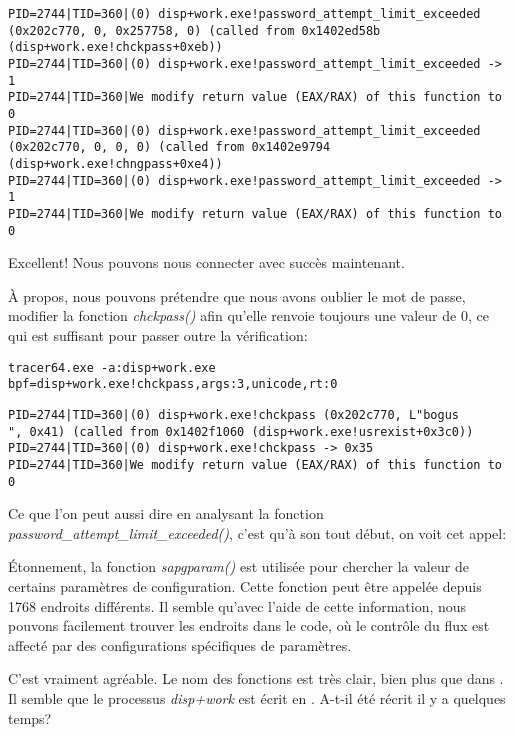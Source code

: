 \begin{lstlisting}
PID=2744|TID=360|(0) disp+work.exe!password_attempt_limit_exceeded (0x202c770, 0, 0x257758, 0) (called from 0x1402ed58b (disp+work.exe!chckpass+0xeb))
PID=2744|TID=360|(0) disp+work.exe!password_attempt_limit_exceeded -> 1
PID=2744|TID=360|We modify return value (EAX/RAX) of this function to 0
PID=2744|TID=360|(0) disp+work.exe!password_attempt_limit_exceeded (0x202c770, 0, 0, 0) (called from 0x1402e9794 (disp+work.exe!chngpass+0xe4))
PID=2744|TID=360|(0) disp+work.exe!password_attempt_limit_exceeded -> 1
PID=2744|TID=360|We modify return value (EAX/RAX) of this function to 0
\end{lstlisting}

Excellent! Nous pouvons nous connecter avec succès maintenant.

À propos, nous pouvons prétendre que nous avons oublier le mot de passe, modifier
la fonction \emph{chckpass()} afin qu'elle renvoie toujours une valeur de 0, ce qui
est suffisant pour passer outre la vérification:

\begin{lstlisting}
tracer64.exe -a:disp+work.exe bpf=disp+work.exe!chckpass,args:3,unicode,rt:0
\end{lstlisting}

\begin{lstlisting}
PID=2744|TID=360|(0) disp+work.exe!chckpass (0x202c770, L"bogus                                   ", 0x41) (called from 0x1402f1060 (disp+work.exe!usrexist+0x3c0))
PID=2744|TID=360|(0) disp+work.exe!chckpass -> 0x35
PID=2744|TID=360|We modify return value (EAX/RAX) of this function to 0
\end{lstlisting}

Ce que l'on peut aussi dire en analysant la fonction\\
\emph{password\_attempt\_limit\_exceeded()},
c'est qu'à son tout début, on voit cet appel:



Étonnement, la fonction \emph{sapgparam()} est utilisée pour chercher la valeur de
certains paramètres de configuration. Cette fonction peut être appelée depuis 1768
endroits différents.
Il semble qu'avec l'aide de cette information, nous pouvons facilement trouver les
endroits dans le code, où le contrôle du flux est affecté par des configurations
spécifiques de paramètres.

C'est vraiment agréable. Le nom des fonctions est très clair, bien plus que dans \oracle.
\myindex{\Cpp}
Il semble que le processus \emph{disp+work} est écrit en \Cpp. A-t-il été récrit il y a quelques temps?
